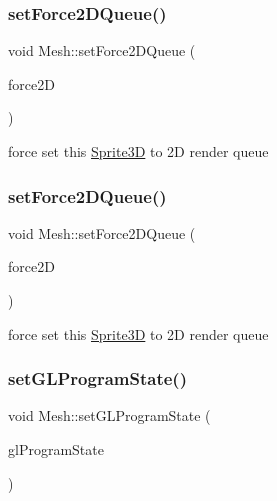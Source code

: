 \subsubsection{\texorpdfstring{set\+Force2\+D\+Queue()}{setForce2DQueue()}\hspace{0.1cm}{\footnotesize\ttfamily [1/2]}}
{\footnotesize\ttfamily void Mesh\+::set\+Force2\+D\+Queue (\begin{DoxyParamCaption}\item[{bool}]{force2D }\end{DoxyParamCaption})\hspace{0.3cm}{\ttfamily [inline]}}

force set this \hyperlink{classSprite3D}{Sprite3D} to 2D render queue \mbox{\label{classMesh_aac7eb18692391478f6bbb0a9937b86fd}} 
\subsubsection{\texorpdfstring{set\+Force2\+D\+Queue()}{setForce2DQueue()}\hspace{0.1cm}{\footnotesize\ttfamily [2/2]}}
{\footnotesize\ttfamily void Mesh\+::set\+Force2\+D\+Queue (\begin{DoxyParamCaption}\item[{bool}]{force2D }\end{DoxyParamCaption})\hspace{0.3cm}{\ttfamily [inline]}}

force set this \hyperlink{classSprite3D}{Sprite3D} to 2D render queue \mbox{\label{classMesh_a0ed181ab96758bfef2c6836aad2d8f8c}} 
\subsubsection{\texorpdfstring{set\+G\+L\+Program\+State()}{setGLProgramState()}\hspace{0.1cm}{\footnotesize\ttfamily [1/2]}}
{\footnotesize\ttfamily void Mesh\+::set\+G\+L\+Program\+State (\begin{DoxyParamCaption}\item[{\hyperlink{classGLProgramState}{G\+L\+Program\+State} $\ast$}]{gl\+Program\+State }\end{DoxyParamCaption})}

